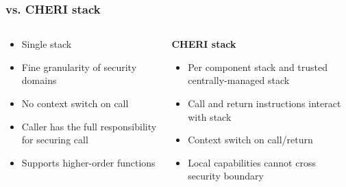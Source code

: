 \documentclass[aspectratio=169]{beamer}
\begin{document}
\begin{frame}
  \frametitle{\stktokens{} vs. CHERI stack}
  \begin{columns}
    \begin{column}{0.5\textwidth}
      \textbf{\stktokens{}}
      \begin{itemize}
      \item Single stack
      \item Fine granularity of security domains
      \item No context switch on call
      \item Caller has the full responsibility for securing call
      \item Supports higher-order functions
      \end{itemize}
    \end{column}
    \begin{column}{0.5\textwidth}
      \textbf{CHERI stack}
      \begin{itemize}
      \item Per component stack and trusted centrally-managed stack
      \item Call and return instructions interact with stack
      \item Context switch on call/return
      \item Local capabilities cannot cross security boundary
      \end{itemize}
    \end{column}
  \end{columns}
\end{frame}
\end{document}
